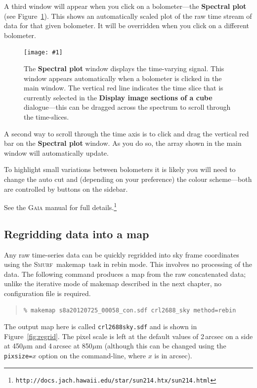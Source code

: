 \documentclass[twoside,11pt]{article}
\newcommand{\htmladdimg}[1]{}
\newcommand{\htmlref}[2]{#1}
\newcommand{\latex}[1]{#1}
\newcommand{\latexhtml}[2]{#1}
\newcommand{\xref}[3]{#1}
\newcommand{\xlabel}[1]{}
\renewcommand{\_}{\texttt{\symbol{95}}}
\newenvironment{myquote}{
   \color{MidnightBlue}\begin{quote}\begin{small}}{
   \end{small}\end{quote}
}
\newcommand{\gaia}{\xref{\textsc{Gaia}}{sun214}{}}
\newcommand{\smurf}{\xref{\textsc{Smurf}}{sun258}{}}
\newcommand{\task}[1]{\textsf{#1}}
\newcommand{\file}[1]{\texttt{#1}}
\newcommand{\url}[1]{\texttt{#1}}
\newcommand{\gaiathing}[1]{\textbf{\textsf{#1}}}
\newcommand{\makemap}{\xref{\task{makemap}}{sun258}{MAKEMAP}}
\newcommand{\myfig}[6]{
  \begin{figure}#2
    \centering\texttt{[image: \#1]}
    \typeout{#1 inserted on page \arabic{page}}
    \caption[#5]{\label{#4}\small #6}
  \end{figure}
}
\newcommand{\myfig}[6]{
    \label{#4} \htmladdimg{#1.png}\\
    \\
    Figure: #6\\
  }
\newcommand{\cref}[3]{\latexhtml{#1~\ref{#2}}{\htmlref{#3}{#2}}}
\renewenvironment{myquote}{
      \begin{quote}\begin{small}}{
      \end{small}\end{quote}
   }
\begin{document}
A third window will appear when you click on a bolometer---the
\gaiathing{Spectral plot} (see \cref{Figure}{fig:gaia_spec}{lower graphic}).
This shows an automatically scaled plot of the raw time stream of data for
that given bolometer. It will be overridden when you click on a different
bolometer.

\myfig{sc21_gaia2}{[t]}{width=0.8\linewidth}{fig:gaia_spec}{
  \gaia\ spectral plot window}{
  The \gaiathing{Spectral plot} window displays the time-varying signal. This window
  appears automatically when a bolometer is clicked in the main window.
  The vertical red line indicates the time slice that is currently selected
  in the \gaiathing{Display image sections of a cube} dialogue---this can be
  dragged across the spectrum to scroll through the time-slices.
}

A second way to scroll through the time axis is to click and drag the
vertical red bar on the \gaiathing{Spectral plot} window. As you do
so, the array shown in the main window will automatically update.

To highlight small variations between bolometers it is likely you will
need to change the auto cut and (depending on your preference) the
colour scheme---both are controlled by buttons on the sidebar.

See the \xref{\textsc{Gaia} manual}{sun214}{} for full
details.\latex{\footnote{\url{http://docs.jach.hawaii.edu/star/sun214.htx/sun214.html}}}

\clearpage
\subsection{\xlabel{regrid_map}Regridding data into a map}
\label{sec:regrid}

Any raw time-series data can be quickly regridded into sky frame
coordinates using the \smurf\ \makemap\ task in rebin mode. This
involves no processing of the data. The following command produces a
map from the raw concatenated data; unlike the iterative mode of
\task{makemap} described in the next chapter, no configuration file is
required.
\begin{myquote}
\begin{verbatim}
% makemap s8a20120725_00058_con.sdf crl2688_sky method=rebin
\end{verbatim}
\end{myquote}
The output map here is called \file{crl2688\_sky.sdf} and is shown
in \cref{Figure}{fig:regrid}{the figure below}.
The pixel scale is left at the default values of 2\,arcsec on a side at
450$\mu$m and 4\,arcsec at 850$\mu$m (although this can be changed
using the \texttt{pixsize=}$x$ option on the command-line, where $x$ is in
arcsec).
\end{document}
